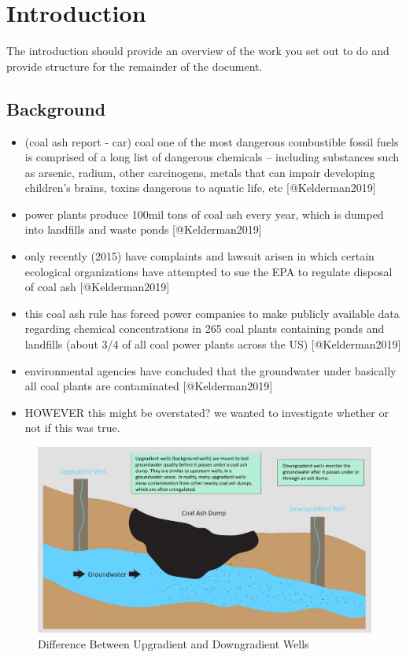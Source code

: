 \documentclass[
]{article}
\author{}
\date{\vspace{-2.5em}}
\begin{document}
\hypertarget{intro}{%
\section{Introduction}\label{intro}}

The introduction should provide an overview of the work you set out to
do and provide structure for the remainder of the document.

\hypertarget{background}{%
\subsection{Background}\label{background}}

\begin{itemize}
\item
  (coal ash report - car) coal one of the most dangerous combustible
  fossil fuels is comprised of a long list of dangerous chemicals --
  including substances such as arsenic, radium, other carcinogens,
  metals that can impair developing children's brains, toxins dangerous
  to aquatic life, etc {[}@Kelderman2019{]}
\item
  power plants produce 100mil tons of coal ash every year, which is
  dumped into landfills and waste ponds {[}@Kelderman2019{]}
\item
  only recently (2015) have complaints and lawsuit arisen in which
  certain ecological organizations have attempted to sue the EPA to
  regulate disposal of coal ash {[}@Kelderman2019{]}
\item
  this coal ash rule has forced power companies to make publicly
  available data regarding chemical concentrations in 265 coal plants
  containing ponds and landfills (about 3/4 of all coal power plants
  across the US) {[}@Kelderman2019{]}
\item
  environmental agencies have concluded that the groundwater under
  basically all coal plants are contaminated {[}@Kelderman2019{]}
\item
  HOWEVER this might be overstated? we wanted to investigate whether or
  not if this was true.
\end{itemize}

\begin{figure}
\includegraphics[width=1\linewidth]{figures/upgradientdowngradient} \caption{Difference Between Upgradient and Downgradient Wells}\label{fig:upgradientdowngradient}
\end{figure}
\end{document}
